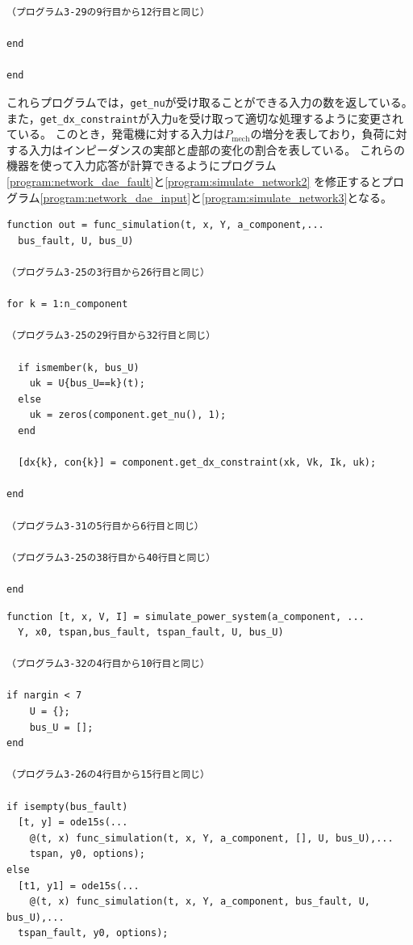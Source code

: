 \documentclass[tombow,dvipdfmx]{corona-a5-1.1}
\begin{document}
\begin{例}
\begin{PROGRAMA}[count,title={load\_impedance.m}]
\begin{verbatim}
（プログラム3-29の9行目から12行目と同じ）

end

end
\end{verbatim}
\end{PROGRAMA}
これらプログラムでは，\verb|get_nu|が受け取ることができる入力の数を返している。
また，\verb|get_dx_constraint|が入力\verb|u|を受け取って適切な処理するように変更されている。
このとき，発電機に対する入力は$P_\mathrm{mech}$の増分を表しており，負荷に対する入力はインピーダンスの実部と虚部の変化の割合を表している。
これらの機器を使って入力応答が計算できるようにプログラム\ref{program:network_dae_fault}と\ref{program:simulate_network2}
を修正するとプログラム\ref{program:network_dae_input}と\ref{program:simulate_network3}となる。

\begin{PROGRAMA}[count,title={func\_simulation.m}]\label{program:network_dae_input}
\begin{verbatim}
function out = func_simulation(t, x, Y, a_component,...
  bus_fault, U, bus_U)

（プログラム3-25の3行目から26行目と同じ）

for k = 1:n_component

（プログラム3-25の29行目から32行目と同じ）
  
  if ismember(k, bus_U)
    uk = U{bus_U==k}(t);
  else
    uk = zeros(component.get_nu(), 1);
  end
  
  [dx{k}, con{k}] = component.get_dx_constraint(xk, Vk, Ik, uk);
  
end

（プログラム3-31の5行目から6行目と同じ）

（プログラム3-25の38行目から40行目と同じ）

end
\end{verbatim}
\end{PROGRAMA}

\begin{PROGRAMA}[count,title={simulate\_power\_system.m}]\label{program:simulate_network3}
\begin{verbatim}
function [t, x, V, I] = simulate_power_system(a_component, ...
  Y, x0, tspan,bus_fault, tspan_fault, U, bus_U)

（プログラム3-32の4行目から10行目と同じ）

if nargin < 7
    U = {};
    bus_U = [];
end

（プログラム3-26の4行目から15行目と同じ）

if isempty(bus_fault)
  [t, y] = ode15s(...
    @(t, x) func_simulation(t, x, Y, a_component, [], U, bus_U),...
    tspan, y0, options);
else
  [t1, y1] = ode15s(...
    @(t, x) func_simulation(t, x, Y, a_component, bus_fault, U, bus_U),...
  tspan_fault, y0, options);
  

\end{verbatim}
\end{PROGRAMA}
\end{例}
\end{document}
